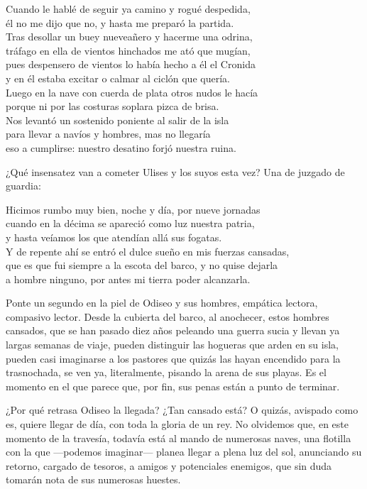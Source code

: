 \begin{versocita}
Cuando le hablé de seguir ya camino y rogué despedida,\\
él no me dijo que no, y hasta me preparó la partida.\\
Tras desollar un buey nueveañero y hacerme una odrina,\\
tráfago en ella de vientos hinchados me ató que mugían,\\
pues despensero de vientos lo había hecho a él el Cronida\\
y en él estaba excitar o calmar al ciclón que quería.\\
Luego en la nave con cuerda de plata otros nudos le hacía\\
porque ni por las costuras soplara pizca de brisa.\\
Nos levantó un sostenido poniente al salir de la isla\\
para llevar a navíos y hombres, mas no llegaría\\
eso a cumplirse: nuestro desatino forjó nuestra ruina.
\end{versocita}

¿Qué insensatez van a cometer Ulises y los suyos esta vez? Una de juzgado de guardia:

\begin{versocita}
Hicimos rumbo muy bien, noche y día, por nueve jornadas\\
cuando en la décima se apareció como luz nuestra patria,\\
y hasta veíamos los que atendían allá sus fogatas.\\
Y de repente ahí se entró el dulce sueño en mis fuerzas cansadas,\\
que es que fui siempre a la escota del barco, y no quise dejarla\\
a hombre ninguno, por antes mi tierra poder alcanzarla.
\end{versocita}

Ponte un segundo en la piel de Odiseo y sus hombres, empática lectora, compasivo lector. Desde la cubierta del barco, al anochecer, estos hombres cansados, que se han pasado diez años peleando una guerra sucia y llevan ya largas semanas de viaje, pueden distinguir las hogueras que arden en su isla, pueden casi imaginarse a los pastores que quizás las hayan encendido para la trasnochada, se ven ya, literalmente, pisando la arena de sus playas. Es el momento en el que parece que, por fin, sus penas están a punto de terminar.

¿Por qué retrasa Odiseo la llegada? ¿Tan cansado está? O quizás, avispado como es, quiere llegar de día, con toda la gloria de un rey. No olvidemos que, en este momento de la travesía, todavía está al mando de numerosas naves, una flotilla con la que ---podemos imaginar--- planea llegar a plena luz del sol, anunciando su retorno, cargado de tesoros, a amigos y potenciales enemigos, que sin duda tomarán nota de sus numerosas huestes.

